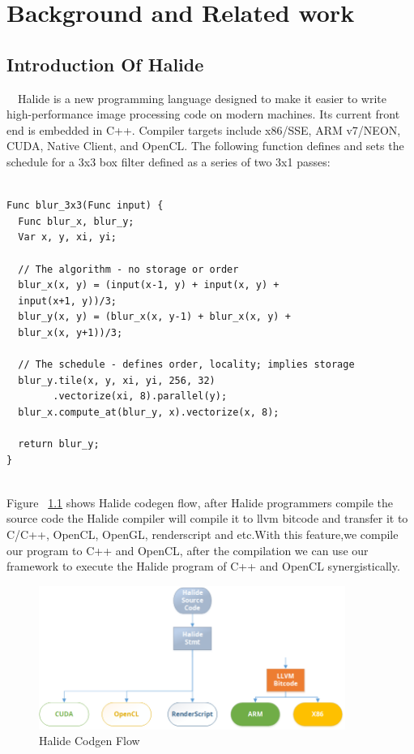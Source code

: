 \chapter{Background and Related work}

\section{Introduction Of Halide}
\quad\ \ Halide\cite{Halide1}\cite{Halide2} is a new programming language designed to make it easier to write high-performance image processing code on modern machines. Its current front end is embedded in C++. Compiler targets include x86/SSE, ARM v7/NEON, CUDA, Native Client, and OpenCL.
The following function defines and sets the schedule for a 3x3 box filter defined as a series of two 3x1 passes:

\lstset{language=C++} %
\begin{lstlisting}[frame=single] % Start your code-block 

Func blur_3x3(Func input) {
  Func blur_x, blur_y;
  Var x, y, xi, yi;

  // The algorithm - no storage or order
  blur_x(x, y) = (input(x-1, y) + input(x, y) + 
  input(x+1, y))/3;
  blur_y(x, y) = (blur_x(x, y-1) + blur_x(x, y) +
  blur_x(x, y+1))/3;

  // The schedule - defines order, locality; implies storage
  blur_y.tile(x, y, xi, yi, 256, 32)
        .vectorize(xi, 8).parallel(y);
  blur_x.compute_at(blur_y, x).vectorize(x, 8);

  return blur_y;
}


\end{lstlisting}

Figure ~\ref{HalideCodegen} shows Halide codegen flow, after Halide programmers compile the source code the Halide compiler will compile it to llvm bitcode and transfer it to C/C++, OpenCL, OpenGL, renderscript and etc.With this feature,we compile our program to C++ and OpenCL, after the compilation we can use our framework to execute the Halide program of C++ and OpenCL synergistically.
\begin{figure}[H]
\centering
\includegraphics[width=10cm]{img/HalideCodegenFlow.png}
\caption{Halide Codgen Flow }
\label{HalideCodegen}
\end{figure}


